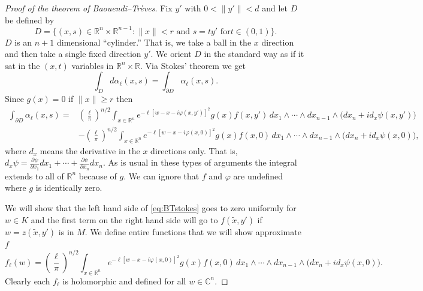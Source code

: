 \documentclass[12pt,openany]{book}
\newcommand{\snorm}[1]{\lVert {#1} \rVert}
\newcommand{\C}{{\mathbb{C}}}
\newcommand{\R}{{\mathbb{R}}}
\theoremstyle{plain}
\theoremstyle{remark}
\theoremstyle{definition}
\theoremstyle{exercise}
\theoremstyle{example}
\begin{document}
\begin{proof}[Proof of the theorem of Baouendi--Tr{\`e}ves]
%
Fix $y'$ with $0 < \snorm{y'} < d$ and let $D$ be defined by
\begin{equation*}
D = \bigl\{ (x,s) \in \R^n \times \R^{n-1} : \snorm{x} < r \text{ and } s = t y' \text{ for
$t \in (0,1)$} \bigr\} .
\end{equation*}
$D$ is an $n+1$ dimensional ``cylinder.''  That is, we take a ball in the
$x$ direction and then take a single fixed direction $y'$.  We orient $D$ in
the standard way as if it sat in the $(x,t)$ variables in $\R^n \times \R$.
Via Stokes' theorem we get
\begin{equation*}
\int_D d \alpha_{\ell} (x,s)
=
\int_{\partial D} \alpha_{\ell} (x,s) .
\end{equation*}
Since $g(x) = 0$ if $\snorm{x} \geq r$ then
\begin{equation} \label{eq:BTstokes}
\begin{split}
\int_{\partial D} \alpha_{\ell}(x,s)
=
&
{\left(\frac{\ell}{\pi}\right)}^{n/2}
\int_{x\in\R^n}
e^{-\ell [w - x-i\varphi(x,y')]^2 } g(x) f(x,y')
\,
dx_1  \wedge
\cdots \wedge
dx_{n-1}
\wedge
\bigl(dx_{n} + i d_x \psi (x,y') \bigr) 
\\
& 
-
{\left(\frac{\ell}{\pi}\right)}^{n/2}
\int_{x \in \R^n}
e^{  -\ell [w - x-i\varphi(x,0)]^2 } g(x) f(x,0)
\,
dx_1  \wedge
\cdots \wedge
dx_{n-1}
\wedge
\bigl(dx_{n} + i d_x \psi (x,0) \bigr) ,
\end{split}
\end{equation}
where $d_x$ means the derivative in the $x$ directions only.
That is, $d_x \psi =
\frac{\partial \psi}{\partial x_1} dx_1
+ \cdots +
\frac{\partial \psi}{\partial x_n} dx_n$.
As is usual in these types of arguments the integral extends to all of
$\R^n$ because of $g$.  We can ignore that $f$ and $\varphi$ are undefined
where $g$ is identically zero.

We will show that the left hand side of \eqref{eq:BTstokes} goes to zero uniformly for $w \in K$
and the first term on the right hand side will go to $f(\tilde{x},y')$
if $w = z(\tilde{x},y')$ is in $M$.  We
define entire functions that we will show approximate $f$
\begin{equation*}
f_\ell(w)
=
{\left(\frac{\ell}{\pi}\right)}^{n/2}
\int_{x \in \R^n}
e^{  -\ell [w - x-i\varphi(x,0)]^2 } g(x) f(x,0)
\,
dx_1  \wedge
\cdots \wedge
dx_{n-1}
\wedge
\bigl(dx_{n} + i d_x \psi (x,0) \bigr) .
\end{equation*}
Clearly each $f_\ell$ is holomorphic and defined for all $w \in \C^n$.


\end{proof}
\end{document}
